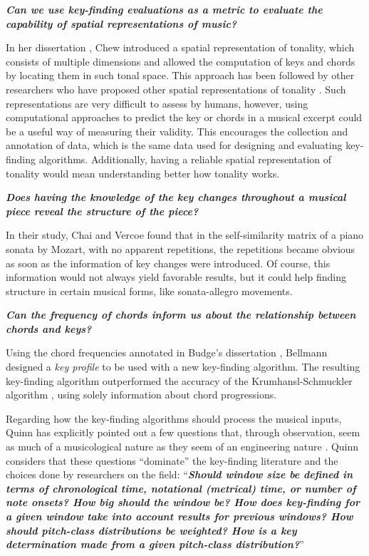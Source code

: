 \textbf{\emph{Can we use key-finding evaluations as a metric to evaluate the capability of spatial representations of music?}}

In her dissertation \cite{chew_towards_2000}, Chew introduced a spatial representation of tonality, which consists of multiple dimensions and allowed the computation of keys and chords by locating them in such tonal space. This approach has been followed by other researchers who have proposed other spatial representations of tonality \cite{harte_detecting_2006}. Such representations are very difficult to assess by humans, however, using computational approaches to predict the key or chords in a musical excerpt could be a useful way of measuring their validity. This encourages the collection and annotation of data, which is the same data used for designing and evaluating key-finding algorithms. Additionally, having a reliable spatial representation of tonality would mean understanding better how tonality works. 

\textbf{\emph{Does having the knowledge of the key changes throughout a musical piece reveal the structure of the piece?}} 

In their study, Chai and Vercoe \cite{chai_detection_2005} found that in the self-similarity matrix of a piano sonata by Mozart, with no apparent repetitions, the repetitions became obvious as soon as the information of key changes were introduced. Of course, this information would not always yield favorable results, but it could help finding structure in certain musical forms, like sonata-allegro movements.

\textbf{\emph{Can the frequency of chords inform us about the relationship between chords and keys?}}

Using the chord frequencies annotated in Budge's dissertation \cite{budge_study_1943}, Bellmann \cite{bellmann_about_2006} designed a \emph{key profile} to be used with a new key-finding algorithm. The resulting key-finding algorithm outperformed the accuracy of the Krumhansl-Schmuckler algorithm \cite{krumhansl_cognitive_1990}, using solely information about chord progressions.

Regarding how the key-finding algorithms should process the musical inputs, Quinn has explicitly pointed out a few questions that, through observation, seem as much of a musicological nature as they seem of an engineering nature \cite{quinn_are_2010}. Quinn considers that these questions ``dominate'' the key-finding literature and the choices done by researchers on the field: ``\textbf{\emph{Should window size be defined in terms of chronological time, notational (metrical) time, or number of note onsets? How big should the window be? How does key-finding for a given window take into account results for previous windows? How should pitch-class distributions be weighted? How is a key determination made from a given pitch-class distribution?}}''

